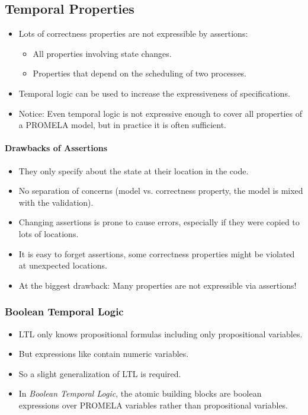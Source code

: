 		\subsection{Temporal Properties}
			\begin{itemize}
				\item Lots of correctness properties are not expressible by assertions:
					\begin{itemize}
						\item All properties involving state changes.
						\item Properties that depend on the scheduling of two processes.
					\end{itemize}
				\item Temporal logic can be used to increase the expressiveness of specifications.
				\item Notice: Even temporal logic is not expressive enough to cover all properties of a PROMELA model, but in practice it is often sufficient.
			\end{itemize}
		
			\paragraph{Drawbacks of Assertions}
				\begin{itemize}
					\item They only specify about the state at their location in the code.
					\item No separation of concerns (model vs. correctness property, the model is mixed with the validation).
					\item Changing assertions is prone to cause errors, especially if they were copied to lots of locations.
					\item It is easy to forget assertions, some correctness properties might be violated at unexpected locations.
					\item At the biggest drawback: Many properties are not expressible via assertions!
				\end{itemize}

			\subsubsection{Boolean Temporal Logic}
				\begin{itemize}
					\item LTL only knows propositional formulas including only propositional variables.
					\item But expressions like  contain numeric variables.
					\item So a slight generalization of LTL is required.
					\item In \textit{Boolean Temporal Logic}, the atomic building blocks are boolean expressions over PROMELA variables rather than propositional variables.
				\end{itemize}
		
